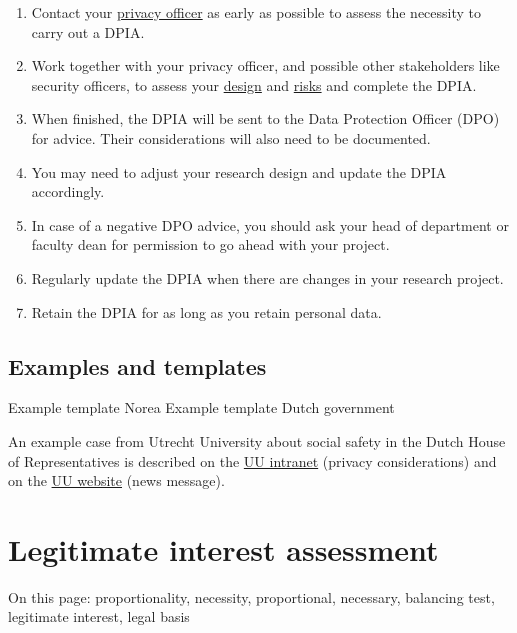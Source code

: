 \documentclass[
]{book}
\providecommand{\tightlist}{%
  \setlength{\itemsep}{0pt}\setlength{\parskip}{0pt}}
\begin{document}
\begin{enumerate}
\def\labelenumi{\arabic{enumi}.}
\tightlist
\item
  Contact your \protect\hyperlink{support}{privacy officer} as early as possible to assess the
  necessity to carry out a DPIA.
\item
  Work together with your privacy officer, and possible other stakeholders like
  security officers, to assess your \protect\hyperlink{privacy-by-design}{design} and
  \protect\hyperlink{risk-assessment}{risks} and complete the DPIA.
\item
  When finished, the DPIA will be sent to the Data Protection Officer (DPO) for
  advice. Their considerations will also need to be documented.
\item
  You may need to adjust your research design and update the DPIA accordingly.
\item
  In case of a negative DPO advice, you should ask your head of department or
  faculty dean for permission to go ahead with your project.
\item
  Regularly update the DPIA when there are changes in your research project.
\item
  Retain the DPIA for as long as you retain personal data.
\end{enumerate}

\hypertarget{examples-and-templates-2}{%
\subsection{Examples and templates}\label{examples-and-templates-2}}

Example template Norea
Example template Dutch government

An example case from Utrecht University about social safety in the Dutch House
of Representatives is described on the
\href{https://intranet.uu.nl/en/news/background/privacy-in-practice-research-into-social-safety-in-the-dutch-house-of-representatives}{UU intranet}
(privacy considerations) and on the
\href{https://www.uu.nl/en/news/utrecht-university-to-study-social-safety-in-dutch-house-of-representatives}{UU website}
(news message).

\hypertarget{legitimate-interest-assessment}{%
\section{Legitimate interest assessment}\label{legitimate-interest-assessment}}

On this page: proportionality, necessity, proportional, necessary, balancing
test, legitimate interest, legal basis
\end{document}
